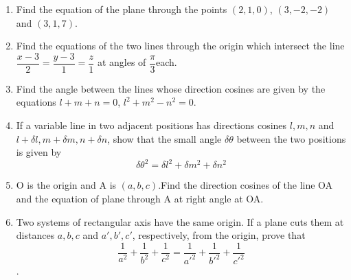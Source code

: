\documentclass[12pt]{article}
\begin{document}
\begin{enumerate}
\item Find the equation of the plane through the points $(2,1,0)$, $(3,-2,-2)$ and $(3,1,7)$.
\item Find the equations of the two lines through the origin which intersect the line $ \dfrac{x-3}{2}=\dfrac{y-3}{1}=\dfrac{z}{1}$ at angles of  $\dfrac{\pi}{3}$each.
\item Find the angle between the lines whose direction cosines are given by the equations $l+m+n=0$, $l^2+m^2-n^2=0$.
\item If a variable line in two adjacent positions has directions cosines $l, m, n$ and $l+\delta l, m+\delta m, n+\delta n$, show that the small angle $\delta\theta$ between the two positions is given by $$\delta\theta^2=\delta l^2+\delta m^2+\delta n^2$$ 
\item O is the origin and A is $(a,b,c)$.Find the direction cosines of the line OA and the equation of plane through A at right angle at OA.
\item Two systems of rectangular axis have the same origin. If a plane cuts them at distances $a,b,c$ and $a\prime,b\prime,c\prime $, respectively, from the origin, prove that $$\frac{1}{a^2}+\frac{1}{b^2}+\frac{1}{c^2}=\frac{1}{{a\prime}^2}+\frac{1}{{b\prime}^2}+\frac{1}{{c\prime}^2}$$.
\end{enumerate}
\end{document}
